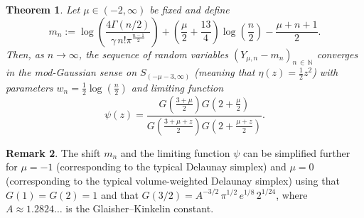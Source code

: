 \documentclass[10pt]{amsart}
\newtheorem{theo}{Theorem}[section]
\theoremstyle{definition}\newtheorem{defi}[theo]{Definition}\newtheorem{rema}[theo]{Remark}\newtheorem{exam}[theo]{Example}\newtheorem{exem}[theo]{Example}\newtheorem{nota}[theo]{Notation}
\newcommand{\N}{\mathbb{N}}
\begin{document}
\begin{theo}\label{thm:ModPhi}
Let $\mu\in(-2,\infty)$ be fixed and define
\[
m_n:=\log\left(\frac{4\Gamma(n/2)}{\gamma\,n!\pi^{\frac{n-1}{2}}}\right)+\left(\frac{\mu}{2}+\frac{13}{4}\right)\log\left(\frac{n}{2}\right)-\frac{\mu+n+1}{2}.
\]
Then, as $n\to\infty$, the sequence of random variables $(Y_{\mu,n}-m_n)_{n\,\in\,\N}$ converges in the mod-Gaussian sense on $S_{(-\mu-3,\infty)}$ (meaning that $\eta(z)=\frac{1}{2}z^2$) with parameters $w_n=\frac{1}{2}\log\left(\frac{n}{2}\right)$ and limiting function
\begin{equation}\label{eq:DefPsi}
\psi(z)=\frac{G\left(\frac{3+\mu}{2}\right)G\left(2+\frac{\mu}{2}\right)}{G\left(\frac{3+\mu+z}{2}\right) G\left(2+\frac{\mu+z}{2}\right)}.
\end{equation}
\end{theo}

\begin{rema}
The shift $m_n$ and the limiting function $\psi$ can be simplified further for $\mu=-1$ (corresponding to the typical Delaunay simplex) and $\mu=0$ (corresponding to the typical volume-weighted Delaunay simplex) using that $G(1)=G(2)=1$ and that $G(3/2)=A^{-3/2}\,\pi^{1/2}\,e^{1/8}\,2^{1/24}$, where $A\approx 1.2824\ldots$ is the Glaisher--Kinkelin constant.
\end{rema}
\end{document}
